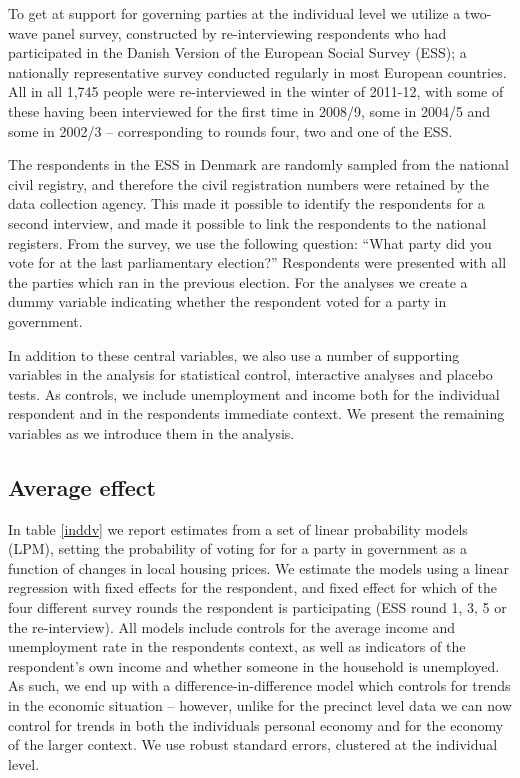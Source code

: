 \documentclass[12pt,a4paper]{article}
\begin{document}
To get at support for governing parties at the individual level we utilize a two-wave panel survey, constructed by re-interviewing respondents who had participated in the Danish Version of the European Social Survey (ESS);  a nationally representative survey conducted regularly in most European countries. All in all 1,745 people were re-interviewed in the winter of 2011-12, with some of these having been interviewed for the first time in 2008/9, some in 2004/5 and some in 2002/3 -- corresponding to rounds four, two and one of the ESS. 

The respondents in the ESS in Denmark are randomly sampled from the national civil registry, and therefore the civil registration numbers were retained by the data collection agency. This made it possible to identify the respondents for a second interview, and made it possible to link the respondents to the national registers. From the survey, we use the following question: ``What party did you vote for at the last parliamentary election?'' Respondents were presented with all the parties which ran in the previous election. For the analyses we create a dummy variable indicating whether the respondent voted for a party in government. 

In addition to these central variables, we also use a number of supporting variables in the analysis for statistical control, interactive analyses and placebo tests. As controls, we include unemployment and income both for the individual respondent and in the respondents immediate context. We present the remaining variables as we introduce them in the analysis.

\subsection{Average effect}
In table \ref{inddv}  we report estimates from a set of linear probability models (LPM), setting the probability of voting for for a party in government as a function of changes in local housing prices. We estimate the models using a linear regression with fixed effects for the respondent, and fixed effect for which of the four different survey rounds the respondent is participating  (ESS round 1, 3, 5 or the re-interview). All models include controls for the average income and unemployment rate in the respondents context, as well as indicators of the respondent's own income and whether someone in the household is unemployed. As such, we end up with a difference-in-difference model which controls for trends in the economic situation -- however, unlike for the precinct level data we can now control for trends in both the individuals personal economy and for the economy of the larger context. We use robust standard errors, clustered at the individual level.
\end{document}
